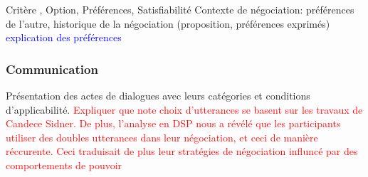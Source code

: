 Critère , Option, Préférences, Satisfiabilité
Contexte de négociation: préférences de l'autre, historique de la négociation (proposition, préférences exprimés)
\textcolor{blue}{explication des préférences}
\subsubsection{Communication}
Présentation des actes de dialogues avec leurs catégories et conditions d'applicabilité. 
\textcolor{red}{Expliquer que note choix d'utterances se basent sur les travaux de Candece Sidner. De plus, l'analyse en DSP nous a révélé que les participants utiliser des doubles utterances dans leur négociation, et ceci de manière réccurente. Ceci traduisait de plus leur stratégies de négociation influncé par des comportements de pouvoir}


